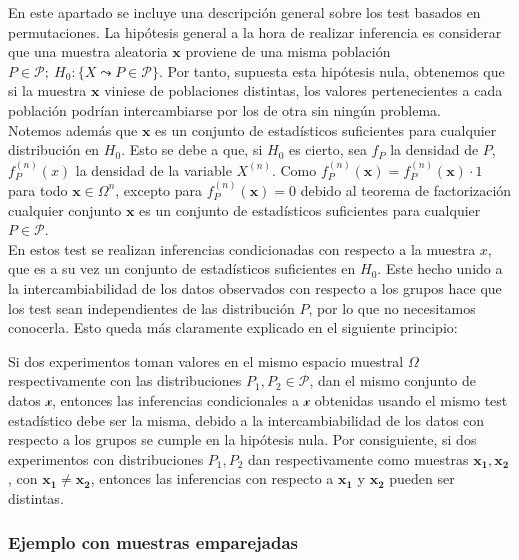 	En este apartado se incluye una descripción general sobre 
los test basados en permutaciones. La hipótesis general a la 
hora de realizar inferencia es considerar que una muestra 
aleatoria $\mathbf{x}$ proviene de una misma población 
$P \in \mathcal{P};\ H_0: \{ X \leadsto P \in 
\mathcal{P} \}$. Por tanto, supuesta esta hipótesis nula, 
obtenemos que si la muestra $\mathbf{x}$ viniese de 
poblaciones distintas, los valores pertenecientes a cada 
población podrían intercambiarse por los de otra sin ningún 
problema.\\
	Notemos además que $\mathbf{x}$ es un conjunto de 
estadísticos suficientes para cualquier distribución en 
$H_0$. Esto se debe a que, si $H_0$ es cierto, sea $f_P$ la 
densidad de $P$, $f_P^{(n)}(x)$ la densidad de la variable 
$X^(n)$. Como $f_P^{(n)}(\mathbf{x}) = f_P^{(n)}(\mathbf{x}) 
\cdot 1$ para todo $\mathbf{x} \in \Omega^n$, excepto para 
$f_P^{(n)}(\mathbf{x}) = 0$ debido al teorema de 
factorización cualquier conjunto $\mathbf{x}$ es un conjunto 
de estadísticos suficientes para cualquier $P \in 
\mathcal{P}$.\\
	En estos test se realizan inferencias condicionadas con
respecto a la muestra $x$, que es a su vez un conjunto de 
estadísticos suficientes en $H_0$. Este hecho unido a la 
intercambiabilidad de los datos observados con respecto a los 
grupos hace que los test sean independientes de las 
distribución $P$, por lo que no necesitamos conocerla. Esto 
queda más claramente explicado en el siguiente principio:

\begin{definicion}
	Si dos experimentos toman valores en el mismo espacio
muestral $\Omega$ respectivamente con las distribuciones 
$P_1, P_2 \in \mathcal{P}$, dan el mismo conjunto de datos 
$\mathcal{x}$, entonces las inferencias condicionales a 
$\mathcal{x}$ obtenidas usando el mismo test estadístico debe 
ser la misma, debido a la intercambiabilidad de los datos con 
respecto a los grupos se cumple en la hipótesis nula. Por 
consiguiente, si dos experimentos con distribuciones 
$P_1, P_2$ dan respectivamente como muestras $\mathbf{x_1}, 
\mathbf{x_2}$, con $\mathbf{x_1} \neq \mathbf{x_2}$, entonces 
las inferencias con respecto a $\mathbf{x_1}$ y 
$\mathbf{x_2}$ pueden ser distintas.
\end{definicion}


\subsubsection{Ejemplo con muestras emparejadas}

